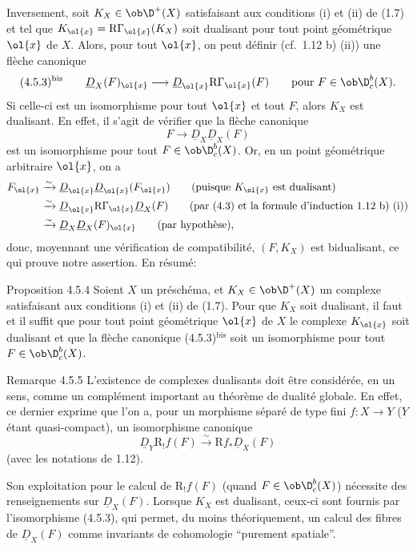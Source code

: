 Inversement, soit $K_X\in\ob\D^+(X)$ satisfaisant aux conditions (i) et (ii) de (1.7) et tel que $K_{\ol{x}}=\mathrm{R}\Gamma_{\ol{x}}(K_X)$ soit dualisant pour tout point géométrique $\ol{x}$ de $X$. Alors, pour tout $\ol{x}$, on peut définir (cf.~1.12 b) (ii)) une flèche canonique
\[
(4.5.3)^{\mathrm{bis}}\qquad \underline{D}_X(F)_{\ol{x}}\longrightarrow \underline{D}_{\ol{x}}\mathrm{R}\Gamma_{\ol{x}}(F)\qquad \text{pour } F\in\ob\D_c^b(X).
\]
Si celle-ci est un isomorphisme pour tout $\ol{x}$ et tout $F$, alors $K_X$ est dualisant. En effet, il s'agit de vérifier que la flèche canonique
\[
F\longrightarrow \underline{D}_X\underline{D}_X(F)
\]
est un isomorphisme pour tout $F\in\ob\D_c^b(X)$. Or, en un point géométrique arbitraire $\ol{x}$, on a
\[
\begin{aligned}
F_{\ol{x}}&\xrightarrow{\sim}\underline{D}_{\ol{x}}\underline{D}_{\ol{x}}(F_{\ol{x}})\qquad\text{(puisque $K_{\ol{x}}$ est dualisant)}\\
&\xrightarrow{\sim}\underline{D}_{\ol{x}}\mathrm{R}\Gamma_{\ol{x}}\underline{D}_X(F)\qquad\text{(par (4.3) et la formule d'induction 1.12 b) (i))}\\
&\xrightarrow{\sim}\underline{D}_X\underline{D}_X(F)_{\ol{x}}\qquad\text{(par hypothèse)},
\end{aligned}
\]
donc, moyennant une vérification de compatibilité, $(F,K_X)$ est bidualisant, ce qui prouve notre assertion. En résumé:

\begin{statement}{Proposition 4.5.4}
Soient $X$ un préschéma, et $K_X\in\ob\D^+(X)$ un complexe satisfaisant aux conditions (i) et (ii) de (1.7). Pour que $K_X$ soit dualisant, il faut et il suffit que pour tout point géométrique $\ol{x}$ de $X$ le complexe $K_{\ol{x}}$ soit dualisant et que la flèche canonique (4.5.3)$^{\mathrm{bis}}$ soit un isomorphisme pour tout $F\in\ob\D_c^b(X)$.
\end{statement}

\begin{statement}{Remarque 4.5.5}
L'existence de complexes dualisants doit être considérée, en un sens, comme un complément important au théorème de dualité globale. En effet, ce dernier exprime que l'on a, pour un morphisme séparé de type fini $f:X\to Y$ ($Y$ étant quasi-compact), un isomorphisme canonique
\[
\underline{D}_Y\mathrm{R}_!f(F)\xrightarrow{\sim}\mathrm{R} f_*\underline{D}_X(F)
\]
(avec les notations de 1.12).

Son exploitation pour le calcul de $\mathrm{R}_!f(F)$ (quand $F\in\ob\D_c^b(X)$) nécessite des renseignements sur $\underline{D}_X(F)$. Lorsque $K_X$ est dualisant, ceux-ci sont fournis par l'isomorphisme (4.5.3), qui permet, du moins théoriquement, un calcul des fibres de $\underline{D}_X(F)$ comme invariants de cohomologie ``purement spatiale''.
\end{statement}

